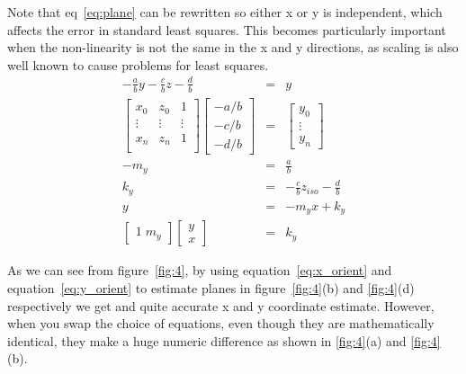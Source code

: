 Note that eq~\ref{eq:plane} can be rewritten so either x or y is independent, which affects the error in standard least squares.  This becomes particularly important when the non-linearity is not the same in the x and y directions, as scaling is also well known to cause problems for least squares.
\begin{eqnarray}
-\frac{a}{b}y - \frac{c}{b}z - \frac{d}{b} & = & y \label{eq:y_orient}\\
\begin{bmatrix}
  x_0  & z_0 & 1 \\
  \vdots & \vdots & \vdots \\
  x_n & z_n & 1 \\
\end{bmatrix}
\begin{bmatrix}
-a/b\\
-c/b\\
-d/b
\end{bmatrix}
& = &
\begin{bmatrix}
y_0 \\
\vdots\\
y_n
\end{bmatrix} \nonumber\\
-m_y & = & \frac{a}{b} \nonumber\\
 k_y & = & - \frac{c}{b}z_{iso} - \frac{d}{b} \nonumber\\
  y  & = & -m_y x + k_y \\
\begin{bmatrix}
1 \; m_y
\end{bmatrix}
\begin{bmatrix}
y \\
x
\end{bmatrix}
& = &
k_y \label{eq:y_est}
\end{eqnarray}



As we can see from figure~\ref{fig:4}, by using equation~\ref{eq:x_orient} and equation~\ref{eq:y_orient} to estimate
planes in figure~\ref{fig:4}(b) and \ref{fig:4}(d) respectively we get and quite accurate x and y coordinate
estimate. However, when you swap the choice of equations, even though they are mathematically identical,
they make a huge numeric difference as shown in \ref{fig:4}(a) and \ref{fig:4}(b).

